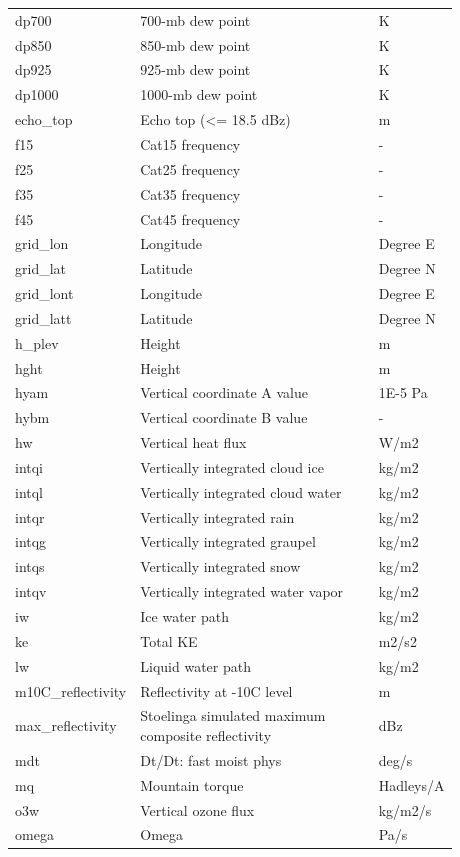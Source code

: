 \documentclass[11pt,fleqn]{report}              %
\begin{document}
\begin{enumerate}
\begin{enumerate}
{\begin{longtable}{p{0.17\linewidth} | p{0.6\linewidth} | p{0.11\linewidth} }
 dp700 & 700-mb dew point & K \\
 dp850 & 850-mb dew point & K \\
 dp925 & 925-mb dew point & K \\
 dp1000 & 1000-mb dew point & K \\
 echo\_top & Echo top (<= 18.5 dBz) & m \\
 f15 & Cat15 frequency & - \\
 f25 & Cat25 frequency & - \\
 f35 & Cat35 frequency & - \\
 f45 & Cat45 frequency & - \\
 grid\_lon & Longitude & Degree E \\
 grid\_lat & Latitude & Degree N \\
 grid\_lont & Longitude & Degree E \\
 grid\_latt & Latitude & Degree N \\
 h\_plev & Height & m \\
 hght & Height & m \\
 hyam & Vertical coordinate A value & 1E-5 Pa \\
 hybm & Vertical coordinate B value & - \\
 hw & Vertical heat flux & W/m2 \\
 intqi & Vertically integrated cloud ice & kg/m2 \\
 intql & Vertically integrated cloud water & kg/m2 \\
 intqr & Vertically integrated rain & kg/m2 \\
 intqg & Vertically integrated graupel & kg/m2 \\
 intqs & Vertically integrated snow & kg/m2 \\
 intqv & Vertically integrated water vapor & kg/m2 \\
 iw & Ice water path & kg/m2 \\
 ke & Total KE & m2/s2 \\
 lw & Liquid water path & kg/m2 \\
 m10C\_reflectivity & Reflectivity at -10C level & m \\
 max\_reflectivity & Stoelinga simulated maximum composite reflectivity & dBz \\
 mdt & Dt/Dt: fast moist phys & deg/s \\
 mq & Mountain torque & Hadleys/A \\
 o3w & Vertical ozone flux & kg/m2/s \\
 omega & Omega & Pa/s \\

\end{longtable}}
\end{enumerate}
\end{enumerate}
\end{document}

